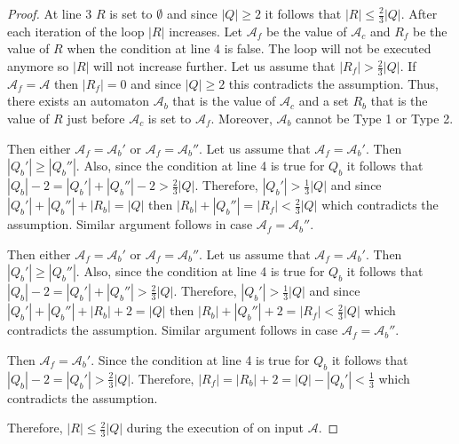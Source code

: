 \begin{proof}
  At line 3 $R$ is set to $\emptyset$ and since $|Q| \geq 2$ it follows that
  $|R| \leq \frac{2}{3} |Q|$. After each iteration of the loop $|R|$ increases.
  Let $\mathcal{A}_f$ be the value of $\mathcal{A}_c$ and $R_f$ be the value
  of $R$ when the condition at line 4 is false. The loop will not be executed
  anymore so $|R|$ will not increase further. Let us assume that $|R_f| >
    \frac{2}{3} |Q|$. If $\mathcal{A}_f = \mathcal{A}$ then $|R_f| = 0$
  and since $|Q| \geq 2$ this contradicts the assumption. Thus, there exists
  an automaton $\mathcal{A}_b$ that is the value of $\mathcal{A}_c$ and a set
  $R_b$ that is the value of $R$ just before $\mathcal{A}_c$ is set to
  $\mathcal{A}_f$. Moreover, $\mathcal{A}_b$ cannot be Type 1 or Type 2.

  \begin{case}
    Then either $\mathcal{A}_f = \mathcal{A}_b'$ or $\mathcal{A}_f =
      \mathcal{A}_b''$. Let us assume that $\mathcal{A}_f =
      \mathcal{A}_b'$. Then $|Q_b'| \geq |Q_b''|$. Also, since the
    condition at line 4 is true for $Q_b$ it follows that $|Q_b| - 2 =
      |Q_b'| + |Q_b''| - 2 > \frac{2}{3} |Q|$. Therefore, $|Q_b'| >
      \frac{1}{3} |Q|$ and since $|Q_b'| + |Q_b''| + |R_b| = |Q|$ then
    $|R_b| + |Q_b''| = |R_f| < \frac{2}{3} |Q|$ which contradicts the
    assumption. Similar argument follows in case $\mathcal{A}_f =
      \mathcal{A}_b''$.
  \end{case}

  \begin{case}
    Then either $\mathcal{A}_f = \mathcal{A}_b'$ or $\mathcal{A}_f =
      \mathcal{A}_b''$. Let us assume that $\mathcal{A}_f =
      \mathcal{A}_b'$. Then $|Q_b'| \geq |Q_b''|$. Also, since the
    condition at line 4 is true for $Q_b$ it follows that $|Q_b| - 2 =
      |Q_b'| + |Q_b''| > \frac{2}{3} |Q|$. Therefore, $|Q_b'| >
      \frac{1}{3} |Q|$ and since $|Q_b'| + |Q_b''| + |R_b| + 2 = |Q|$ then
    $|R_b| + |Q_b''| + 2 = |R_f| < \frac{2}{3} |Q|$ which contradicts
    the assumption. Similar argument follows in case $\mathcal{A}_f =
      \mathcal{A}_b''$.
  \end{case}

  \begin{case}
    Then $\mathcal{A}_f = \mathcal{A}_b'$. Since the condition at line 4
    is true for $Q_b$ it follows that $|Q_b| - 2 = |Q_b'| > \frac{2}{3}
      |Q|$. Therefore, $|R_f| = |R_b| + 2 = |Q| - |Q_b'| < \frac{1}{3}$
    which contradicts the assumption.
  \end{case}

  \noindent
  Therefore, $|R| \leq \frac{2}{3} |Q|$ during the execution of
   on input $\mathcal{A}$.
\end{proof}

